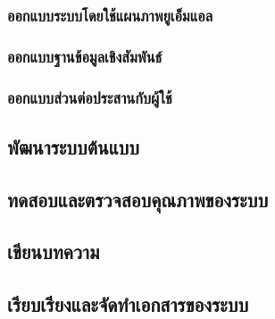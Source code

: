 \documentclass[a4paper]{article}
\begin{document}
\subsubsection{ออกแบบระบบโดยใช้แผนภาพยูเอ็มแอล}
\subsubsection{ออกแบบฐานข้อมูลเชิงสัมพันธ์}
\subsubsection{ออกแบบส่วนต่อประสานกับผู้ใช้}
\subsection{พัฒนาระบบต้นแบบ}
\subsection{ทดสอบและตรวจสอบคุณภาพของระบบ}
\subsection{เขียนบทความ}
\subsection{เรียบเรียงและจัดทําเอกสารของระบบ}
\end{document}
